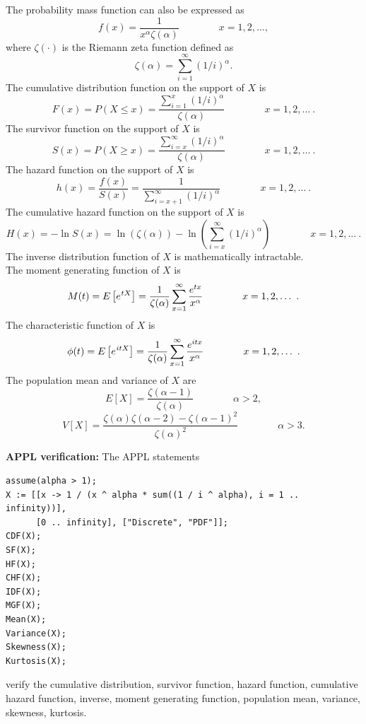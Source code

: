 \documentclass[12pt,fullpage]{article}
\begin{document}
\noindent
The probability mass function can also be expressed as
$$
f(x) = \frac{1}{x^{\alpha} \zeta(\alpha)} \qquad \qquad x = 1,2, \ldots,
$$
where $\zeta(\cdot)$ is the Riemann zeta function defined as
$$
\zeta(\alpha) = \sum_{i=1}^{\infty} (1/i)^{\alpha}.
$$
The cumulative distribution function on
the support of $X$ is
$$
F(x) = P(X \le x) = \frac{\sum_{i=1}^{x} (1/i)^{\alpha}}{\zeta(\alpha)} \qquad \qquad  x = 1, 2, \dots \ .
$$
The survivor function on the support of $X$ is
$$
S(x) = P(X \ge x) = \frac{\sum_{i=x}^{\infty} (1/i)^{\alpha}}{\zeta(\alpha)} \qquad \qquad  x = 1, 2, \dots \ .
$$
The hazard function on the support of $X$ is
$$
h(x) = \frac{f(x)}{S(x)} = \frac{1}{\sum_{i=x+1}^{\infty} (1/i)^{\alpha}} \qquad \qquad  x = 1, 2, \dots \ .
$$
The cumulative hazard function on the support of $X$ is
$$
H(x) = - \ln S(x) = \ln \left(\zeta(\alpha) \right) - \ln \left(\sum_{i=x}^{\infty} (1/i)^{\alpha} \right) \qquad \qquad  x = 1, 2, \dots \ .
$$
The inverse distribution function of $X$ is mathematically intractable.\\
The moment generating function of $X$ is
$$
M(t) = E\left[ e ^ {\kern 0.04 em tX} \right] = \frac{1}{\zeta(\alpha)} \sum_{x=1}^{\infty} \frac{e^{tx}}{x^{\alpha}} \qquad \qquad x = 1,2, \dots \ .
$$
The characteristic function of $X$ is
$$
\phi(t) = E\left[ e ^ {\kern 0.04 em itX} \right] =  \frac{1}{\zeta(\alpha)} \sum_{x=1}^{\infty} \frac{e^{itx}}{x^{\alpha}} \qquad \qquad x = 1,2, \dots \ .
$$
The population mean and variance of $X$ are
$$
E[X] = \frac{\zeta(\alpha - 1)}{\zeta(\alpha)} \qquad \qquad \alpha > 2,
$$
$$
V[X] = \frac{\zeta(\alpha)\zeta(\alpha - 2) - \zeta(\alpha - 1)^2}{\zeta(\alpha)^2} \qquad \qquad \alpha > 3.
$$
\vspace{0.1in}

\noindent
{\bf APPL verification:}
The APPL statements
\begin{verbatim}
assume(alpha > 1);
X := [[x -> 1 / (x ^ alpha * sum((1 / i ^ alpha), i = 1 .. infinity))],
      [0 .. infinity], ["Discrete", "PDF"]];
CDF(X);
SF(X);
HF(X);
CHF(X);
IDF(X);
MGF(X);
Mean(X);
Variance(X);
Skewness(X);
Kurtosis(X);
\end{verbatim}
verify the cumulative distribution, survivor function, hazard function, cumulative hazard function, inverse, moment generating function, population mean, variance, skewness, kurtosis.
\end{document}
